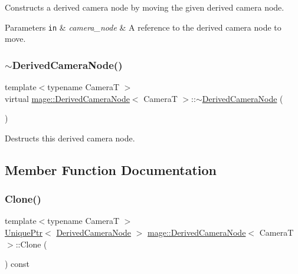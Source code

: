 Constructs a derived camera node by moving the given derived camera node.


\begin{DoxyParams}[1]{Parameters}
\mbox{\tt in}  & {\em camera\+\_\+node} & A reference to the derived camera node to move. \\
\hline
\end{DoxyParams}
\hypertarget{classmage_1_1_derived_camera_node_a74ab678b593c43b6bf95bb7fbfbd4d2d}{}\label{classmage_1_1_derived_camera_node_a74ab678b593c43b6bf95bb7fbfbd4d2d} 
\subsubsection{\texorpdfstring{$\sim$\+Derived\+Camera\+Node()}{~DerivedCameraNode()}}
{\footnotesize\ttfamily template$<$typename CameraT $>$ \\
virtual \hyperlink{classmage_1_1_derived_camera_node}{mage\+::\+Derived\+Camera\+Node}$<$ CameraT $>$\+::$\sim$\hyperlink{classmage_1_1_derived_camera_node}{Derived\+Camera\+Node} (\begin{DoxyParamCaption}{ }\end{DoxyParamCaption})\hspace{0.3cm}{\ttfamily [virtual]}}

Destructs this derived camera node. 

\subsection{Member Function Documentation}
\hypertarget{classmage_1_1_derived_camera_node_a29e597fe2c9e0f37eeab8fec5330d764}{}\label{classmage_1_1_derived_camera_node_a29e597fe2c9e0f37eeab8fec5330d764} 
\subsubsection{\texorpdfstring{Clone()}{Clone()}}
{\footnotesize\ttfamily template$<$typename CameraT $>$ \\
\hyperlink{namespacemage_a3316d7143a973e37adf1110f2e80ca31}{Unique\+Ptr}$<$ \hyperlink{classmage_1_1_derived_camera_node}{Derived\+Camera\+Node} $>$ \hyperlink{classmage_1_1_derived_camera_node}{mage\+::\+Derived\+Camera\+Node}$<$ CameraT $>$\+::Clone (\begin{DoxyParamCaption}{ }\end{DoxyParamCaption}) const}

